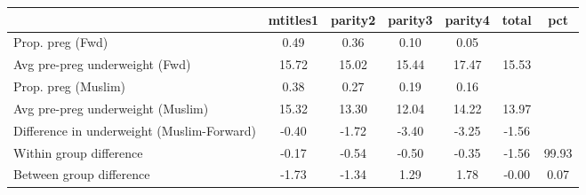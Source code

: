 \begin{tabular}{l*{6}{c}}
\toprule
            &\multicolumn{1}{c}{mtitles1}&\multicolumn{1}{c}{parity2}&\multicolumn{1}{c}{parity3}&\multicolumn{1}{c}{parity4}&\multicolumn{1}{c}{total}&\multicolumn{1}{c}{pct}\\
\midrule
\midrule
Prop. preg (Fwd)&        0.49&        0.36&        0.10&        0.05&            &            \\
Avg pre-preg underweight (Fwd)&       15.72&       15.02&       15.44&       17.47&       15.53&            \\
Prop. preg (Muslim)&        0.38&        0.27&        0.19&        0.16&            &            \\
Avg pre-preg underweight (Muslim)&       15.32&       13.30&       12.04&       14.22&       13.97&            \\
Difference in underweight (Muslim-Forward)&       -0.40&       -1.72&       -3.40&       -3.25&       -1.56&            \\
Within group difference&       -0.17&       -0.54&       -0.50&       -0.35&       -1.56&       99.93\\
Between group difference&       -1.73&       -1.34&        1.29&        1.78&       -0.00&        0.07\\
\bottomrule
\end{tabular}
